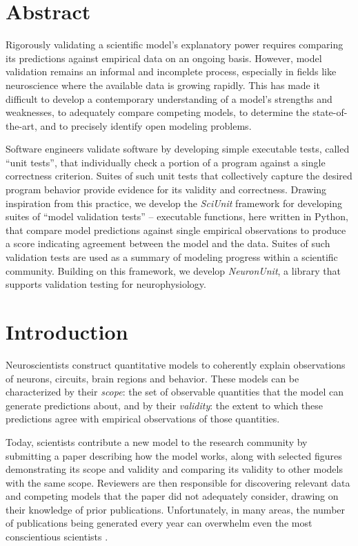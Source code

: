 \documentclass[11pt,letterpaper]{article}
\begin{document}
\section{Abstract}
Rigorously validating a scientific model's explanatory power requires comparing its predictions against empirical data on an ongoing basis. 
However, model validation remains an informal and incomplete process, especially in fields like neuroscience where the available data is growing rapidly.   
This has made it difficult to develop a contemporary understanding of a model's strengths and weaknesses, to adequately compare competing models, to determine the state-of-the-art, and to precisely identify open modeling problems.

Software engineers validate software by developing simple executable tests, called ``unit tests'', that individually check a portion of a program against a single correctness criterion. Suites of such unit tests that collectively capture the desired program behavior provide evidence for its validity and correctness. Drawing inspiration from this practice, we develop the \textit{SciUnit} framework for developing suites of ``model validation tests'' -- 
executable functions, here written in Python, that compare model predictions against single empirical observations to  produce a score indicating agreement between the model and the data. Suites of such validation tests are used as a summary of modeling progress within a scientific community. 
Building on this framework, we develop \textit{NeuronUnit}, a library that supports validation testing for neurophysiology.

\section{Introduction}
Neuroscientists construct quantitative models to coherently explain observations of neurons, circuits, brain regions and behavior. 
These models can be characterized by their \textit{scope}: the set of observable quantities that the model can generate predictions about, and by their \textit{validity}: the extent to which these predictions agree with empirical observations of those quantities.

Today, scientists contribute a new model to the research community by submitting a paper describing how the model works, along with selected figures demonstrating its scope and validity and comparing its validity to other models with the same scope. Reviewers are then responsible for discovering relevant data and competing models that the paper did not adequately consider, drawing on their knowledge of prior publications. Unfortunately, in many areas, the number of publications being generated every year can overwhelm  even the most conscientious  scientists . 
\end{document}
